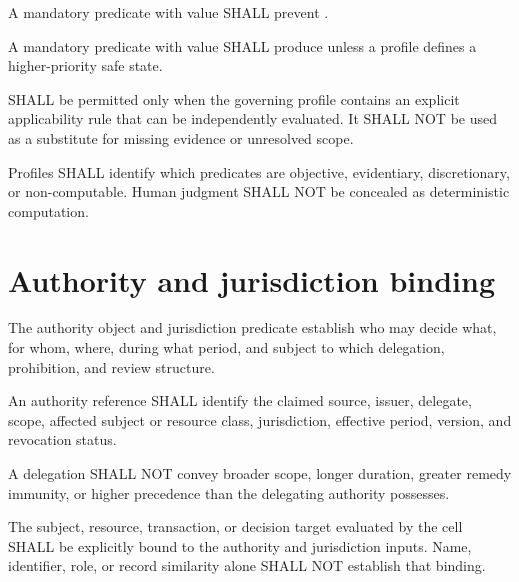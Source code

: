 \begin{requirement}[ACA-120-006]
A mandatory predicate with value  SHALL prevent
.
\end{requirement}

\begin{requirement}[ACA-120-007]
A mandatory predicate with value  SHALL produce
 unless a profile defines a higher-priority safe state.
\end{requirement}

\begin{requirement}[ACA-120-008]
 SHALL be permitted only when the governing profile
contains an explicit applicability rule that can be independently evaluated.
It SHALL NOT be used as a substitute for missing evidence or unresolved scope.
\end{requirement}

\begin{requirement}[ACA-120-009]
Profiles SHALL identify which predicates are objective, evidentiary,
discretionary, or non-computable. Human judgment SHALL NOT be concealed as
deterministic computation.
\end{requirement}

\section{Authority and jurisdiction binding}
The authority object and jurisdiction predicate establish who may decide what,
for whom, where, during what period, and subject to which delegation,
prohibition, and review structure.

\begin{requirement}[ACA-120-010]
An authority reference SHALL identify the claimed source, issuer, delegate,
scope, affected subject or resource class, jurisdiction, effective period,
version, and revocation status.
\end{requirement}

\begin{requirement}[ACA-120-011]
A delegation SHALL NOT convey broader scope, longer duration, greater remedy
immunity, or higher precedence than the delegating authority possesses.
\end{requirement}

\begin{requirement}[ACA-120-012]
The subject, resource, transaction, or decision target evaluated by the cell
SHALL be explicitly bound to the authority and jurisdiction inputs. Name,
identifier, role, or record similarity alone SHALL NOT establish that binding.
\end{requirement}

